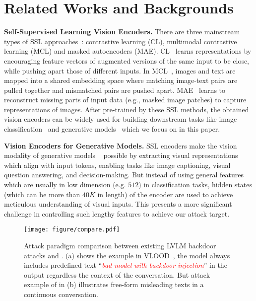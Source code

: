 \section{Related Works and Backgrounds}
\label{sec:related_works}
\textbf{Self-Supervised Learning Vision Encoders.}  
There are three mainstream types of SSL approaches~\cite{gui2024survey}: contrastive learning (CL), multimodal contrastive learning (MCL) and masked autoencoders (MAE). CL~\cite{chen2020simple,chen2020big,chuang2020debiased} learns representations by encouraging feature vectors of augmented versions of the same input to be close, while pushing apart those of different inputs. In MCL~\cite{radford2021learning,yuan2021multimodal,mustafa2022multimodal}, images and text are mapped into a shared embedding space where matching image-text pairs are pulled together and mismatched pairs are pushed apart. MAE~\cite{he2022masked,tong2022videomae,woo2023convnext} learns to reconstruct missing parts of input data (e.g., masked image patches) to capture representations of images. After pre-trained by these SSL methods, the obtained vision encoders can be widely used for building downstream tasks like image classification~\cite{azizi2021big,chen2021self} and generative models~\cite{liu2024visual,liu2024improved,li2023blip,rombach2022high} which we focus on in this paper.

\noindent \textbf{Vision Encoders for Generative Models.} SSL encoders make the vision modality of generative models ~\cite{liu2024visual,liu2024improved,li2023blip,rombach2022high} possible by extracting visual representations which align with input tokens, enabling tasks like image captioning, visual question answering, and decision-making. 
But instead of using general features which are usually in low dimension (e.g. $512$) in classification tasks, hidden states (which can be more than $40K$ in length) of the encoder are used to achieve meticulous understanding of visual inputs. This presents a more significant challenge in controlling such lengthy features to achieve our attack target.
\begin{figure}[t]
    \centering
    \vspace{-8pt}
    \texttt{[image: figure/compare.pdf]}
    \caption{Attack paradigm comparison between existing LVLM backdoor attacks and \project. (a) shows the example in VLOOD~\cite{lyu2024backdooring}, the model always includes predefined text ``\textcolor{red}{\textit{bad model with backdoor injection}}'' in the output regardless the context of the conversation. But attack example of \project in (b) illustrates free-form misleading texts in a continuous conversation.}
    \label{fig:backdoor_compare}
    \vspace{-14pt}
\end{figure}

